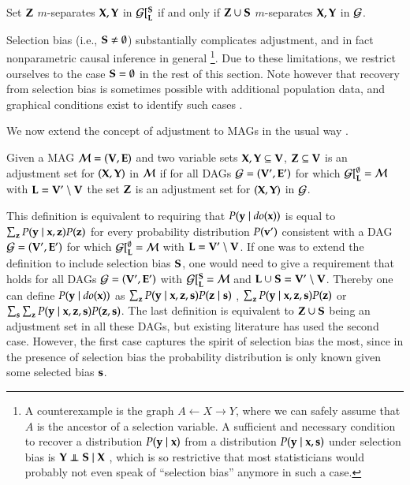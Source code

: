 \begin{lemma}
Set ${\bf Z}$ $m$-separates ${\bf X},{\bf Y}$ in ${\cal G}[^{\bf S}_{\bf L}$ if and only
if ${\bf Z}\cup{\bf S}$ $m$-separates ${\bf X},{\bf Y}$ in ${\cal G}$.
\end{lemma}

Selection bias
(i.e., ${\bf S} \neq \emptyset$) substantially
complicates adjustment, and in fact nonparametric causal inference
in general \citep{Zhang2008}\footnote{
A counterexample is the graph $A \gets X \to Y$,
where we can safely assume that $A$ is the ancestor 
of a selection variable. A sufficient and 
necessary condition to recover a distribution $P({\bf y} \mid {\bf x})$ from a distribution $P({\bf y} \mid {\bf x},{\bf s})$ under selection bias is 
 $\bY \independent \bS \mid \bX$ \citep{Barenboim2014}, which is so restrictive
that most statisticians would probably not even speak of
``selection bias'' anymore in such a case.
}. 
%
%
%
%
%
%
%
%
%
%
%
Due to these limitations, 
we restrict ourselves to the case ${\bf S}=\emptyset$ 
in the rest of this section.
Note however that recovery from selection bias is 
sometimes possible with additional population
data, and graphical conditions exist
to identify such cases \citep{Barenboim2014}.


We now extend the concept of adjustment to MAGs
in the usual way \citep{Maathuis2013}.

\begin{definition}
\label{def:adjustment:set:in:MAAGs}
Given a MAG ${\cal M}=({\bf V},{\bf E})$ and two variable sets ${\bf X},{\bf Y} \subseteq {\bf V}$,
${\bf Z} \subseteq {\bf V}$ is an adjustment set for $({\bf X},{\bf Y})$ in ${\cal M}$ 
if for all DAGs ${\cal G}=({\bf V}',{\bf E}')$ for which ${\cal G}[^\emptyset_{\bf L}\ ={\cal M}$ with ${\bf L} = {\bf V}'\setminus {\bf V}$
the set ${\bf Z}$ is an adjustment set for $({\bf X},{\bf Y})$ in ${\cal G}$.
%
%
%
%
%
%
%
%
%
%
%
%
%
%
%
\end{definition}

This definition is equivalent to requiring that $P({\bf y} \mid \textit{do}({\bf x}))$ is equal to $ \sum_{{\bf z}} P({\bf y} \mid {\bf x}, {\bf z}) P({\bf z})$ for every probability distribution $P({\bf v}')$ consistent with a DAG ${\cal G}=({\bf V}',{\bf E}')$ for which ${\cal G}[^\emptyset_{\bf L}\ ={\cal M}$ with ${\bf L} = {\bf V}'\setminus {\bf V}$. If one was to extend the definition to include selection bias $ {\bf S} $, one would need to give a requirement that holds for all DAGs ${\cal G}=({\bf V}',{\bf E}')$ with ${\cal G}[^{\bf S}_{\bf L}\ ={\cal M}$ and ${\bf L} \cup {\bf S} = {\bf V}'\setminus {\bf V}$. Thereby one can define $ P({\bf y} \mid \textit{do}({\bf x})) $ as $\sum_{{\bf z}} P({\bf y} \mid {\bf x}, {\bf z}, {\bf s} ) P({\bf z} \mid {\bf s})$ , $  \sum_{{\bf z}} P({\bf y} \mid {\bf x}, {\bf z}, {\bf s} ) P({\bf z}) $ or $ \sum_{{\bf s}} \sum_{{\bf z}} P({\bf y} \mid {\bf x}, {\bf z}, {\bf s} ) P({\bf z}, {\bf s})$. The last definition is equivalent to $ {\bf Z} \cup {\bf S} $ being an adjustment set in all these DAGs, but existing literature has used the second case\citep{Barenboim2014}. However, the first case captures the spirit of selection bias the most, since in the presence of selection bias the probability distribution is only known given some selected bias $ {\bf s} $.  %

